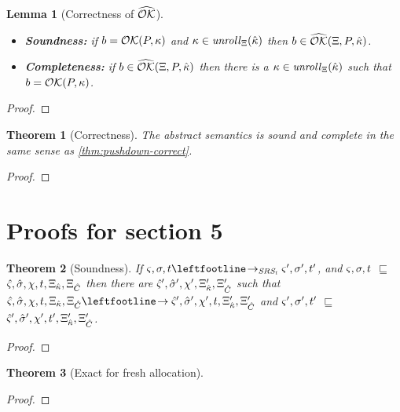 \documentclass{article}
\newtheorem{theorem}{Theorem}
\newtheorem{lemma}{Lemma}
\begin{document}
\begin{lemma}[Correctness of $\widehat{{\mathcal O}{\mathcal K}}$]
  \begin{itemize}
  \item{\textbf{Soundness:} if $b = {\mathcal O}{\mathcal K}(P,\kappa)$ and $\kappa \in \mathit{unroll}_{\Xi}(\hat{\kappa})$ then $b \in \widehat{{\mathcal O}{\mathcal K}}(\Xi,P,\hat{\kappa})$.}
  \item{\textbf{Completeness:} if $b \in \widehat{{\mathcal O}{\mathcal K}}(\Xi,P,\hat{\kappa})$ then there is a $\kappa \in \mathit{unroll}_{\Xi}(\hat{\kappa})$ such that $b = {\mathcal O}{\mathcal K}(P,\kappa)$.}
  \end{itemize}
\end{lemma}
\begin{proof}
\end{proof}

\begin{theorem}[Correctness]
  The abstract semantics is sound and complete in the same sense as \autoref{thm:pushdown-correct}.
\end{theorem}
\begin{proof}
\end{proof}

\section{Proofs for section 5}

\begin{theorem}[Soundness]
  If $\mstate,\mstore,\mtime \stepto_{\SRSt} \mstate',\mstore',\mtime'$, and $\varsigma,\sigma,t$ $\sqsubseteq$ $\hat\varsigma,\hat\sigma,\chi,t,\Xi_{\hat{\kappa}},\Xi_{\hat{C}}$ then there are $\hat\varsigma',\hat\sigma',\chi',\Xi_{\hat{\kappa}}',\Xi_{\hat{C}}'$ such that $\mastate,\mastore,\mmktab,\mtime,\mktab_{\makont},\mktab_{\mamkont} \stepto \mastate',\mastore',\mmktab',\mtime,\mktab_{\makont}',\mktab_{\mamkont}'$ and
$\varsigma',\sigma',t'$ $\sqsubseteq$ $\hat\varsigma',\hat\sigma',\chi',t',\Xi_{\hat{\kappa}}',\Xi_{\hat{C}}'$.
\end{theorem}
\begin{proof}
\end{proof}

\begin{theorem}[Exact for fresh allocation]
\end{theorem}
\begin{proof}
\end{proof}
\end{document}
